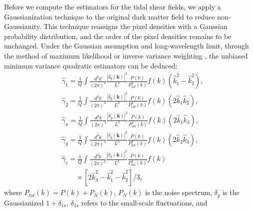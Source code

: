 \documentclass[aps,prd,twocolumn,showpacs,superscriptaddress,groupedaddress,nofootinbib]{revtex4}  %
\begin{document}
Before we compute the estimators for the tidal shear fields, we apply a Gaussianization technique \cite{1992MNRAS.254..315W} to the original dark matter field to reduce non-Gaussianity. This technique reassigns the pixel densities with a Gaussian probability distribution, and the order of the pixel densities remains to be unchanged.
Under the Gaussian assumption and long-wavelength limit, through the method of maximum likelihood \cite{2008:lu} or inverse variance weighting \cite{2010lu,2012bucher}, the unbiased minimum variance quadratic estimators can be deduced: 
\begin{equation}
\begin{split}
&\hat{\gamma}_1=\frac{1}{Q}\int\frac{d^3k}{(2{\pi})^3}\frac{|\delta_{g}(\bm{k})|^2}{L^3}\frac{P(k)}{P^2_{tot}(k)}f(k)(\hat{k}^2_{1}-\hat{k}^2_{2}),\\
&\hat{\gamma}_2=\frac{1}{Q}\int\frac{d^3k}{(2{\pi})^3}\frac{|\delta_{g}(\bm{k})|^2}{L^3}\frac{P(k)}{P^2_{tot}(k)}f(k)(2\hat{k}_{1}\hat{k}_{2}),\\
&\hat{\gamma}_x=\frac{1}{Q}\int\frac{d^3k}{(2{\pi})^3}\frac{|\delta_{g}(\bm{k})|^2}{L^3}\frac{P(k)}{P^2_{tot}(k)}f(k)(2\hat{k}_{1}\hat{k}_{3}),\\
&\hat{\gamma}_y=\frac{1}{Q}\int\frac{d^3k}{(2{\pi})^3}\frac{|\delta_{g}(\bm{k})|^2}{L^3}\frac{P(k)}{P^2_{tot}(k)}f(k)(2\hat{k}_{2}\hat{k}_{3}),\\
&\hat{\gamma}_z=\frac{1}{Q}\int\frac{d^3k}{(2{\pi})^3}\frac{|\delta_{g}(\bm{k})|^2}{L^3}\frac{P(k)}{P^2_{tot}(k)}f(k) \\
&\quad\quad\times[2\hat{k}^2_{3}-\hat{k}^2_{1}-\hat{k}^2_{2}]/3,
\end{split}
\label{eq7}
\end{equation}
where $P_{tot}(k) = P(k) + P_{N}(k)$, $P_{N}(k)$ is the noise spectrum, $\delta_{g}$ is the Gaussianized $1+\delta_{1s}$, $\delta_{1s}$ refers to the small-scale fluctuations, and
\end{document}
